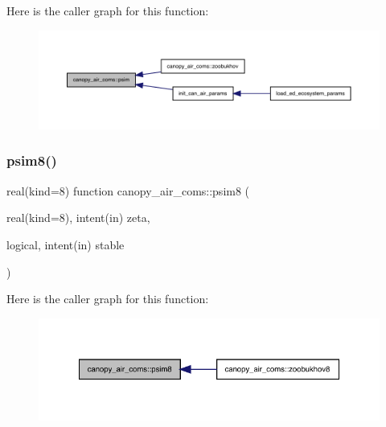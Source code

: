 Here is the caller graph for this function\+:
\nopagebreak
\begin{figure}[H]
\begin{center}
\leavevmode
\includegraphics[width=350pt]{namespacecanopy__air__coms_ab103fa081460babbe04c9a5a4699be5f_icgraph}
\end{center}
\end{figure}
\mbox{\label{namespacecanopy__air__coms_aba7cbe776dbfa9815870ad3686949041}} 
\subsubsection{\texorpdfstring{psim8()}{psim8()}}
{\footnotesize\ttfamily real(kind=8) function canopy\+\_\+air\+\_\+coms\+::psim8 (\begin{DoxyParamCaption}\item[{real(kind=8), intent(in)}]{zeta,  }\item[{logical, intent(in)}]{stable }\end{DoxyParamCaption})}

Here is the caller graph for this function\+:
\nopagebreak
\begin{figure}[H]
\begin{center}
\leavevmode
\includegraphics[width=335pt]{namespacecanopy__air__coms_aba7cbe776dbfa9815870ad3686949041_icgraph}
\end{center}
\end{figure}
\mbox{\label{namespacecanopy__air__coms_a6062471b3381c283205ea8b27383a5e0}} 
